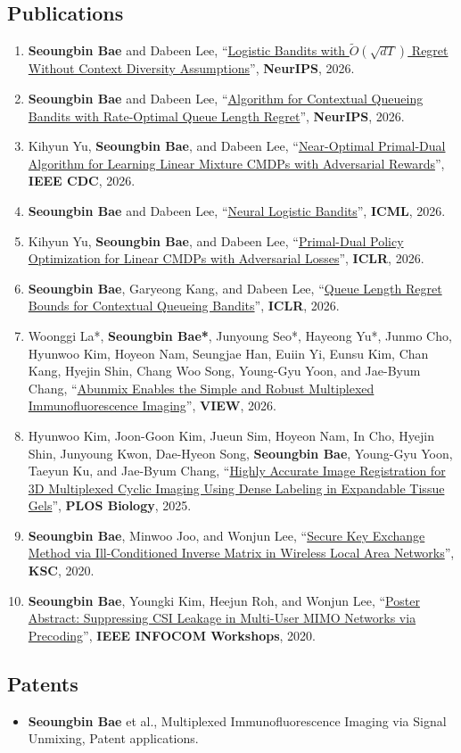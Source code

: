 \documentclass[10pt]{article}
\newcommand{\pub}[1]{\item #1}
\newcommand{\cvtitle}[1]{\uline{#1}}
\begin{document}
\subsection*{Publications}
\begin{enumerate}
  \pub{\textbf{Seoungbin Bae} and Dabeen Lee, ``\cvtitle{Logistic Bandits with $\tilde{O}(\sqrt{dT})$ Regret Without Context Diversity Assumptions}'', \textbf{NeurIPS}, 2026.}
  \pub{\textbf{Seoungbin Bae} and Dabeen Lee, ``\cvtitle{Algorithm for Contextual Queueing Bandits with Rate-Optimal Queue Length Regret}'', \textbf{NeurIPS}, 2026.}
  \pub{Kihyun Yu, \textbf{Seoungbin Bae}, and Dabeen Lee, ``\cvtitle{Near-Optimal Primal-Dual Algorithm for Learning Linear Mixture CMDPs with Adversarial Rewards}'', \textbf{IEEE CDC}, 2026.}
  \pub{\textbf{Seoungbin Bae} and Dabeen Lee, ``\cvtitle{Neural Logistic Bandits}'', \textbf{ICML}, 2026.}
  \pub{Kihyun Yu, \textbf{Seoungbin Bae}, and Dabeen Lee, ``\cvtitle{Primal-Dual Policy Optimization for Linear CMDPs with Adversarial Losses}'', \textbf{ICLR}, 2026.}
  \pub{\textbf{Seoungbin Bae}, Garyeong Kang, and Dabeen Lee, ``\cvtitle{Queue Length Regret Bounds for Contextual Queueing Bandits}'', \textbf{ICLR}, 2026.}
  \pub{Woonggi La*, \textbf{Seoungbin Bae*}, Junyoung Seo*, Hayeong Yu*, Junmo Cho, Hyunwoo Kim, Hoyeon Nam, Seungjae Han, Euiin Yi, Eunsu Kim, Chan Kang, Hyejin Shin, Chang Woo Song, Young-Gyu Yoon, and Jae-Byum Chang, ``\cvtitle{Abunmix Enables the Simple and Robust Multiplexed Immunofluorescence Imaging}'', \textbf{VIEW}, 2026.}
  \pub{Hyunwoo Kim, Joon-Goon Kim, Jueun Sim, Hoyeon Nam, In Cho, Hyejin Shin, Junyoung Kwon, Dae-Hyeon Song, \textbf{Seoungbin Bae}, Young-Gyu Yoon, Taeyun Ku, and Jae-Byum Chang, ``\cvtitle{Highly Accurate Image Registration for 3D Multiplexed Cyclic Imaging Using Dense Labeling in Expandable Tissue Gels}'', \textbf{PLOS Biology}, 2025.}
  \pub{\textbf{Seoungbin Bae}, Minwoo Joo, and Wonjun Lee, ``\cvtitle{Secure Key Exchange Method via Ill-Conditioned Inverse Matrix in Wireless Local Area Networks}'', \textbf{KSC}, 2020.}
  \pub{\textbf{Seoungbin Bae}, Youngki Kim, Heejun Roh, and Wonjun Lee, ``\cvtitle{Poster Abstract: Suppressing CSI Leakage in Multi-User MIMO Networks via Precoding}'', \textbf{IEEE INFOCOM Workshops}, 2020.}
\end{enumerate}

\subsection*{Patents}
\begin{itemize}
  \item \textbf{Seoungbin Bae} et al., Multiplexed Immunofluorescence Imaging via Signal Unmixing, Patent applications.
\end{itemize}
\end{document}

